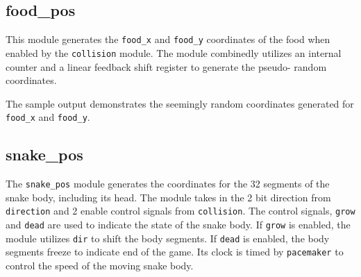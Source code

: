 \documentclass[paper=usletter, fontsize=12pt]{article}
\begin{document}
        \subsection{food\_pos} This module generates the \texttt{food\_x} and
        \texttt{food\_y} coordinates of the food when enabled by the
        \texttt{collision} module. The module combinedly utilizes an internal
        counter and a linear feedback shift register to generate the pseudo-
        random coordinates.


        The sample output demonstrates the seemingly random coordinates
        generated for \texttt{food\_x} and \texttt{food\_y}.

        \subsection{snake\_pos} The \texttt{snake\_pos} module generates the
        coordinates for the 32 segments of the snake body, including its head.
        The module takes in the 2 bit direction from \texttt{direction} and 2
        enable control signals from \texttt{collision}. The control signals,
        \texttt{grow} and \texttt{dead} are used to indicate the state of the
        snake body. If \texttt{grow} is enabled, the module utilizes
        \texttt{dir} to shift the body segments. If \texttt{dead} is enabled,
        the body segments freeze to indicate end of the game. Its clock is
        timed by \texttt{pacemaker} to control the speed of the moving snake
        body.

\end{document}
